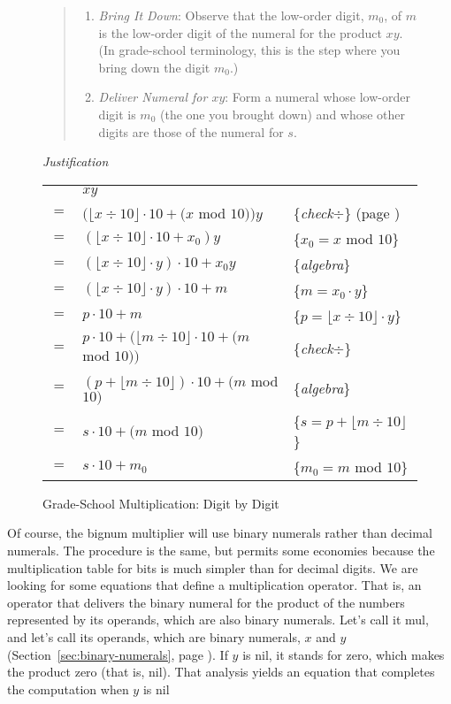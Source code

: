 \begin{figure}
\begin{quote}
\begin{enumerate}
\item \emph{Bring It Down}:
Observe that the low-order digit, $m_0$, of $m$
is the low-order digit of the numeral for the product $x y$.
(In grade-school terminology,
this is the step where you bring down the digit $m_0$.)

\item \emph{Deliver Numeral for $x y$}:
Form a numeral whose low-order digit is $m_0$ (the one you brought down)
and whose other digits are those of the numeral for $s$.
\end{enumerate}
\end{quote}

\emph{Justification}
\begin{center}
\begin{tabular}{cll}
    & $x y$ & \\
$=$ & $(\lfloor x \div 10\rfloor \cdot 10 + (x$ mod $10)) y$  & \{\emph{check}$\div$\} (page \pageref{third-grade-division})\\
$=$ & $(\lfloor x \div 10\rfloor \cdot 10 + x_0) y$           & \{$x_0=x$ mod $10$\}\\
$=$ & $(\lfloor x \div 10\rfloor \cdot y) \cdot 10 + x_0 y$   & \{\emph{algebra}\} \\
$=$ & $(\lfloor x \div 10\rfloor \cdot y) \cdot 10 + m$       & \{$m=x_0\cdot y$\} \\
$=$ & $p \cdot 10 + m$                                        & \{$p=\lfloor x \div 10\rfloor \cdot y$\} \\
$=$ & $p \cdot 10 + (\lfloor m \div 10 \rfloor \cdot 10 + (m$ mod $10))$& \{\emph{check}$\div$\} \\
$=$ & $(p + \lfloor m \div 10 \rfloor) \cdot 10 + (m$ mod $10)$       & \{\emph{algebra}\} \\
$=$ & $s \cdot 10 + (m$ mod $10)$                             & \{$s=p + \lfloor m \div 10 \rfloor$\} \\
$=$ & $s \cdot 10 + m_0$                                      & \{$m_0=m$ mod $10$\} \\
\end{tabular}
\end{center}
\label{multiplication!grade school}
\caption{Grade-School Multiplication: Digit by Digit}
\label{fig:grade-school-mult}
\end{figure}

Of course, the bignum multiplier
will use binary numerals rather than decimal numerals.
The procedure is the same, but permits some economies
because the multiplication table for bits is much simpler
than for decimal digits.
We are looking for some equations that define a multiplication operator.
That is, an operator that delivers the binary numeral for the product of the numbers
represented by its operands, which are also binary numerals.
Let's call it \textsf{mul}, and let's call its operands, which are binary numerals,
$x$ and $y$ (Section~\ref{sec:binary-numerals}, page \pageref{sec:binary-numerals}).
If $y$ is nil, it stands for zero,
which makes the product zero (that is, \textsf{nil}).
That analysis yields an equation that completes
the computation when $y$ is \textsf{nil}

